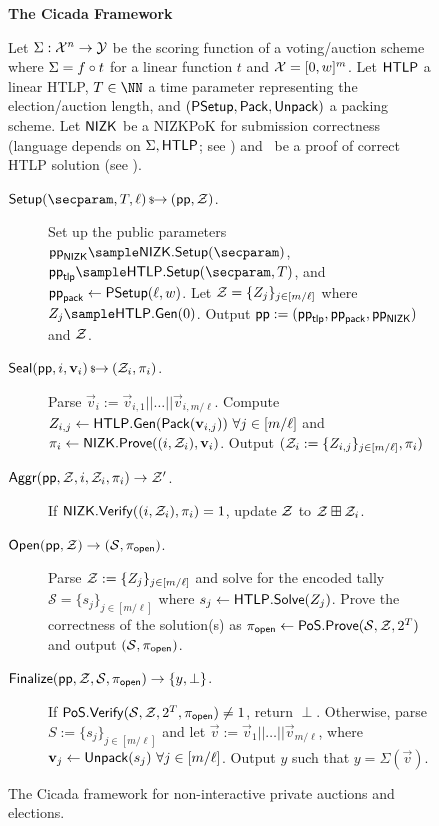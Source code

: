 \begin{figure*}[t!]
\begin{mdframed}
\begin{center}
    \textbf{The Cicada Framework}
\end{center}
Let $\Sigma: \mathcal{X}^n \rightarrow \mathcal{Y}$ be the scoring function of a voting/auction scheme
where $\Sigma = f \circ t$ for a linear function $t$ and
$\mathcal{X} = [0,w]^m$. 
Let $\mathsf{HTLP}$ a linear HTLP, $\timeT \in \NN$ a time parameter representing the election/auction length, and $(\mathsf{P}\mathsf{Setup}, \mathsf{Pack}, \mathsf{Unpack})$ a packing scheme.
Let $\mathsf{NIZK}$ be a NIZKPoK for 
submission correctness (language depends on $\Sigma, \mathsf{HTLP}$; see )
and \pos\ be a proof of correct HTLP solution (see ). 

\hrulefill %
\begin{description}
    \item[$\Setup(\secparam, \timeT, \ell) \randout (\pparam, \Z)$.] 
    Set up the public parameters $\pparam_{\NIZK} \sample \NIZK.\Setup(\secparam)$, $\pparam_{\sf tlp} \sample \htlp.\Setup(\secparam, \timeT)$, and $\mathsf{pp}_{\sf pack} \gets \mathsf{P}\mathsf{Setup}(\ell, w)$. 
    Let $\mathcal{Z} = \{Z_j\}_{j \in [m/\ell]}$ where $Z_j \sample \htlp.{\sf Gen}(0)$. Output $\mathsf{pp} := (\mathsf{pp}_{\sf tlp}, \mathsf{pp}_{\sf pack}, \mathsf{pp}_{\mathsf{NIZK}})$ and $\mathcal{Z}$.
    \item[$\mathsf{Seal}(\mathsf{pp},i, \mathbf{v}_i) \,{\mbox{\scriptsize${\$}$\normalsize}\!\!\to}\hskip2.3pt (\mathcal{Z}_i, \pi_i)$.] Parse $\vec{v}_i := \vec{v}_{i,1} || \dots || \vec{v}_{i,m/\ell}$. Compute $Z_{i,j} \gets \mathsf{HTLP}.{\sf Gen}(\mathsf{Pack}(\mathbf{v}_{i,j}))~\forall j \in [m/\ell]$ and $\pi_i \gets \mathsf{NIZK}.\mathsf{Prove}((i, \mathcal{Z}_i), \mathbf{v}_i)$.
    Output $(\mathcal{Z}_i := \{Z_{i,j}\}_{j \in [m/\ell]}, \pi_i)$ 
    \item[$\mathsf{Aggr}(\mathsf{pp},\mathcal{Z},i,\mathcal{Z}_i,\pi_i) \rightarrow \mathcal{Z}'$.] If $\mathsf{NIZK}.\mathsf{Verify}((i, \mathcal{Z}_i), \pi_i) = 1$, update $\mathcal{Z}$ to $\mathcal{Z} \boxplus \mathcal{Z}_i$. %
    \item[$\mathsf{Open}(\mathsf{pp},\mathcal{Z}) \rightarrow (\mathcal{S}, \pi_{\sf open})$.] Parse $\mathcal{Z} := \{Z_j\}_{j \in [m/\ell]}$ and solve for the encoded tally $\mathcal{S} = \{s_j\}_{j \in [m/\ell]}$ where $s_j \gets \mathsf{HTLP}.{\sf Solve}(Z_j)$. Prove the correctness of the solution(s) as $\pi_{\sf open} \gets {\sf PoS}.{\sf Prove}(\mathcal{S}, \mathcal{Z}, 2^{T})$ and output $(\mathcal{S}, \pi_{\sf open})$.
    \item[$\mathsf{Finalize}(\mathsf{pp}, \mathcal{Z}, \mathcal{S}, \pi_{\sf open}) \rightarrow \{y,\perp\}$.] If ${\sf PoS}.{\sf Verify}(\mathcal{S}, \mathcal{Z}, 2^{T}, \pi_{\sf open}) \neq 1$, return $\perp$. Otherwise, parse $S := \{s_j\}_{j \in [m/\ell]}$ and let $\Vec{v} := \vec{v}_1 || \dots || \vec{v}_{m/\ell}$, where $\mathbf{v}_j \gets \mathsf{Unpack}(s_j)~\forall j \in [m/\ell]$. Output 
    $y$ such that $y = \Sigma(\vec{v})$.
\end{description}
\end{mdframed}
\caption{The Cicada framework for non-interactive private auctions and elections.}
\label{fig:cicada}
\end{figure*}